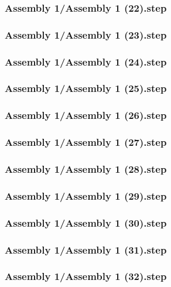 \documentclass[a4paper,12pt]{article}
\begin{document}
\begin{lstlising}[language=C++]
\subsubsection{Assembly 1/Assembly 1 (22).step}

\subsubsection{Assembly 1/Assembly 1 (23).step}

\subsubsection{Assembly 1/Assembly 1 (24).step}

\subsubsection{Assembly 1/Assembly 1 (25).step}

\subsubsection{Assembly 1/Assembly 1 (26).step}

\subsubsection{Assembly 1/Assembly 1 (27).step}

\subsubsection{Assembly 1/Assembly 1 (28).step}

\subsubsection{Assembly 1/Assembly 1 (29).step}

\subsubsection{Assembly 1/Assembly 1 (30).step}

\subsubsection{Assembly 1/Assembly 1 (31).step}

\subsubsection{Assembly 1/Assembly 1 (32).step}


\end{lstlising}
\end{document}

